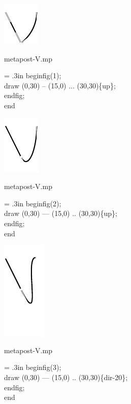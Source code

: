\documentclass[danish,a2paper,11pt]{scrartcl}
\begin{document}
\begin{multicols*}{3}
\columnbreak

\center
\includegraphics[scale=5]{metapoints/metapoints-9.pdf}
\vspace{2cm}

\flushleft
\color{White}
\romansmall
metapost-V.mp\\
\vspace{.4cm}
\color{Black}
\typewritersmall
{\leftskip = .3in
beginfig(1);\\
draw (0,30) -- (15,0) ... (30,30)\{up\};\\
endfig;\\
end
\par}
\vspace{2cm}

\center
\includegraphics[scale=5]{metapoints/metapoints-10.pdf}
\vspace{2cm}

\flushleft
\color{White}
\romansmall
metapost-V.mp\\
\vspace{.4cm}
\color{Black}
\typewritersmall
{\leftskip = .3in
beginfig(2);\\
draw (0,30) --- (15,0) .. (30,30)\{up\};\\
endfig;\\
end
\par}
\vspace{2cm}

\center
\includegraphics[scale=5]{metapoints/metapoints-11.pdf}
\vspace{0cm}

\flushleft
\color{White}
\romansmall
metapost-V.mp\\
\vspace{.4cm}
\color{Black}
\typewritersmall
{\leftskip = .3in
beginfig(3);\\
draw (0,30) --- (15,0) .. (30,30)\{dir-20\};\\
endfig;\\
end
\par}
\vspace{2cm}

\end{multicols*}
\end{document}
